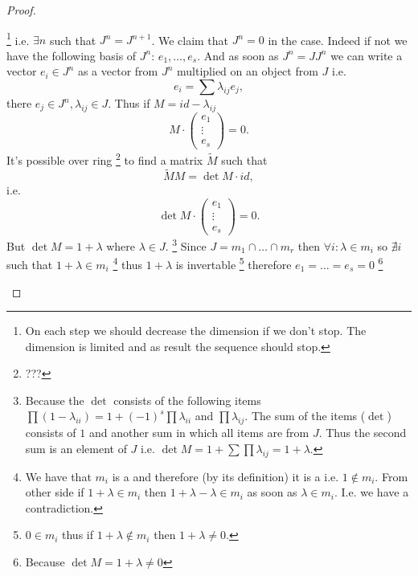 \begin{theorem}
\begin{proof}
\begin{enumerate}
      \footnote {
        On each step we should decrease the dimension if we don't
        stop. The dimension is limited and as result the sequence
        should stop.
      }
      i.e.
      $\exists n$ such that $J^n = J^{n+1}$. We claim that $J^n = 0$
      in the case. Indeed if not we have the following basis of $J^n$:
      $e_1, \dots, e_s$. And as soon as $J^n = J J^n$ we can write a
      vector $e_i \in J^n$ as a vector from $J^n$ multiplied on an
      object from $J$ i.e.
      \[
      e_i = \sum \lambda_{ij} e_j,
      \]
      there $e_j \in J^n, \lambda_{ij} \in J$. Thus if
      $M = id - \lambda_{ij}$
      \[
      M \cdot \left(
      \begin{array}{c}
        e_1 \\
        \vdots \\
        e_s
      \end{array}
      \right) = 0.
      \]
      It's possible over ring
      \footnote{
        ???
      }
      to find a matrix $\tilde{M}$ such that
      \[
      \tilde{M} M = \det M \cdot id,
      \]
      i.e.
      \[
      \det M \cdot \left(
      \begin{array}{c}
        e_1 \\
        \vdots \\
        e_s
      \end{array}
      \right) = 0.
      \]
      But $\det M = 1 + \lambda$ where $\lambda \in J$.
      \footnote{
        Because the $\det$ consists of the following 
        items $\prod (1-\lambda_{ii}) = 1 + (-1)^s\prod \lambda_{ii}$
        and $\prod \lambda_{ij}$. The sum of the items ($\det$)
        consists of $1$ and another sum in which all items are from
        $J$. Thus the second sum is an element of $J$ i.e.
        $\det M = 1 + \sum \prod \lambda_{ij} = 1 + \lambda$.
      }
      Since  $J = m_1 \cap \dots \cap m_r$ then
      $\forall i: \lambda \in m_i$
      so $\nexists i$ such that $1 + \lambda \in m_i$
      \footnote{
        We have that $m_i$ is a  and therefore (by
        its definition) it is a  i.e.
        $1 \notin m_i$. From other side if $1 + \lambda \in m_i$ then
        $1 + \lambda - \lambda \in m_i$ as soon as $\lambda \in
        m_i$. I.e. we have a contradiction.  
      }
      thus $1 + \lambda$ is invertable
      \footnote {
        $0 \in m_i$ thus if $1 + \lambda \notin m_i$ then
        $1 + \lambda \ne 0$.
      }
      therefore $e_1 = \dots = e_s = 0$
      \footnote{
        Because $\det M = 1 + \lambda \ne 0$
}
\end{enumerate}
\end{proof}
\end{theorem}
